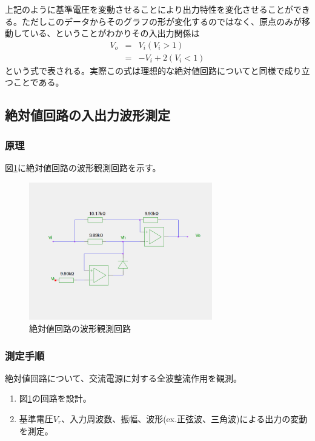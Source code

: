 \documentclass[11pt,a4j]{jsarticle}
\begin{document}
    上記のように基準電圧を変動させることにより出力特性を変化させることができる。ただしこのデータからそのグラフの形が変化するのではなく、原点のみが移動している、ということがわかりその入出力関係は
    \begin{eqnarray}
    V_o &=& V_i (V_i > 1) \\
           &=& - V_i + 2 (V_i <1)
    \end{eqnarray}
    という式で表される。実際この式は理想的な絶対値回路についてと同様で成り立つことである。
        
    
    
  \subsection{絶対値回路の入出力波形測定}
   \subsubsection{原理}
    
    図\ref{fig:abs_wave}に絶対値回路の波形観測回路を示す。
    
    \begin{figure}[htbp]
  \centering
  \includegraphics[width=8cm,clip]{abs_wave.png}
  \caption{絶対値回路の波形観測回路}
  \label{fig:abs_wave}
 \end{figure}%
    
   \subsubsection{測定手順}
    絶対値回路について、交流電源に対する全波整流作用を観測。
    \begin{enumerate}
    \item 図\ref{fig:abs_wave}の回路を設計。
    \item 基準電圧$V_r$、入力周波数、振幅、波形(ex.正弦波、三角波)による出力の変動を測定。
    \end{enumerate}
    
\end{document}
